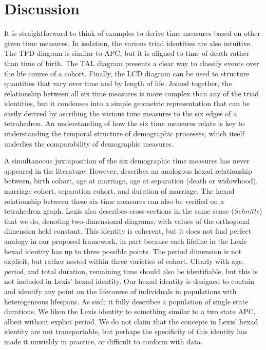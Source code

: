 \documentclass[12pt,oneside,a4paper]{article} %
\begin{document}

\FloatBarrier
\section{Discussion}

It is straightforward to
think of examples to derive time measures based on other given
time measures. In isolation, the various triad identities are also intuitive.
The TPD diagram is similar to APC, but it is aligned to time of death rather
than time of birth. The TAL diagram presents a clear way to classify events
over the life course of a cohort. Finally, the LCD diagram can be used to
structure quantities that vary over time and by length of life.
Joined together, the relationship between all six time measures is more
complex than any of the triad identities, but it condenses into a simple
geometric representation that can be easily derived by ascribing the various time measures to the six edges of a tetrahedron. An understanding of how the six time measures relate is
key to understanding the temporal structure of demographic processes, which
itself underlies the comparability of demographic measures.

A simultaneous juxtaposition of
the six demographic time measures has never appeared in the literature. However,
\citet{lexis1875einleitung} describes an analogous hexad relationship between,
birth cohort, age at marriage, age at separation (death or widowhood), marriage cohort, separation cohort, and
duration of marriage. The hexad relationship between these six
time measures can also be verified on a tetrahedron graph. Lexis also describes
cross-sections in the same sense (\textit{Schnitte}) that we do, denoting
two-dimensional diagrams, with values of the orthogonal dimension held constant.
This identity is coherent, but it does not find perfect
analogy in our proposed framework, in part because each lifeline in the Lexis
hexad identity has up to three possible points. The period dimension is
not explicit, but rather nested within three varieties of cohort.
Clearly with age, \textit{period}, and total duration, remaining
time should also be identifiable, but this is not included in Lexis' hexad
identity. Our hexad identity is designed to contain and identify any point on
the lifecourse of individuals in populations with heterogeneous
lifespans. As such it fully describes a population of single state durations.
We liken the Lexis identity to something similar to a two state APC, albeit
without explict period. We do not claim that the concepts in Lexis' hexad
identity are not transportable, but perhaps the specificity of this identity has made it unwieldy in practice, or difficult to conform with data.
\end{document}
